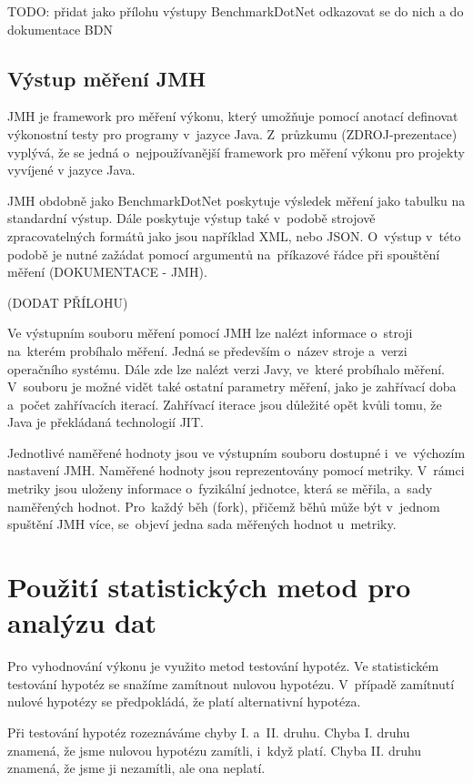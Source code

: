 TODO: přidat jako přílohu výstupy BenchmarkDotNet odkazovat se do nich a do dokumentace BDN

\subsection{Výstup měření JMH}

JMH je framework pro měření výkonu, který umožňuje pomocí anotací definovat výkonostní testy
pro programy v~jazyce Java. Z~průzkumu (ZDROJ-prezentace) vyplývá, že se jedná o~nejpoužívanější framework
pro měření výkonu pro projekty vyvíjené v jazyce Java. %

JMH obdobně jako BenchmarkDotNet poskytuje výsledek měření jako tabulku na standardní výstup.
Dále poskytuje výstup také v~podobě strojově zpracovatelných formátů jako jsou například XML,
nebo JSON. O~výstup v~této podobě je nutné zažádat pomocí argumentů na~příkazové řádce při
spouštění měření (DOKUMENTACE - JMH).

(DODAT PŘÍLOHU)

Ve výstupním souboru měření pomocí JMH lze nalézt informace o~stroji na~kterém probíhalo měření.
Jedná se především o~název stroje a~verzi operačního systému. Dále zde lze nalézt verzi Javy,
ve~které probíhalo měření. V~souboru je možné vidět také ostatní parametry měření, jako je
zahřívací doba a~počet zahřívacích iterací. Zahřívací iterace jsou důležité opět kvůli tomu,
že Java je překládaná technologií JIT.

Jednotlivé naměřené hodnoty jsou ve výstupním souboru dostupné i~ve~výchozím nastavení JMH.
Naměřené hodnoty jsou reprezentovány pomocí metriky. V~rámci metriky jsou uloženy informace
o~fyzikální jednotce, která se měřila, a~sady naměřených hodnot. Pro~každý běh (fork), přičemž běhů
může být v~jednom spuštění JMH více, se~objeví jedna sada měřených hodnot u~metriky.

\section{Použití statistických metod pro analýzu dat}

Pro vyhodnování výkonu je využito metod testování hypotéz. Ve statistickém testování
hypotéz se snažíme zamítnout nulovou hypotézu. V~případě zamítnutí nulové hypotézy
se předpokládá, že platí alternativní hypotéza.

Při testování hypotéz rozeznáváme
chyby I. a~II. druhu. Chyba I. druhu znamená, že jsme nulovou hypotézu zamítli,
i~když platí. Chyba II. druhu znamená, že jsme ji nezamítli, ale ona neplatí.

